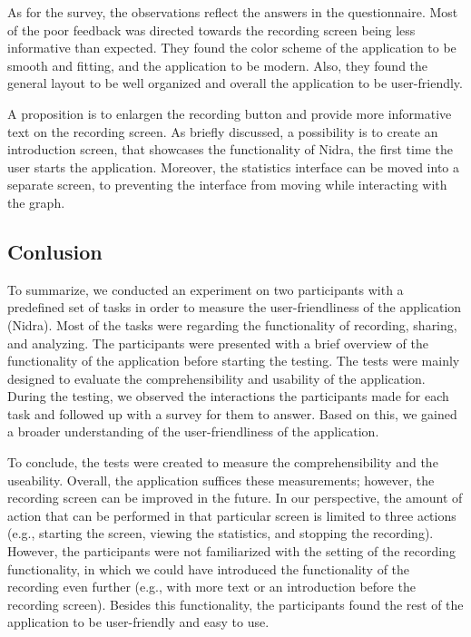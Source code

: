 As for the survey, the observations reflect the answers in the questionnaire. Most of the poor feedback was directed towards the recording screen being less informative than expected. They found the color scheme of the application to be smooth and fitting, and the application to be modern. Also, they found the general layout to be well organized and overall the application to be user-friendly.

A proposition is to enlargen the recording button and provide more informative text on the recording screen. As briefly discussed, a possibility is to create an introduction screen, that showcases the functionality of Nidra, the first time the user starts the application. Moreover, the statistics interface can be moved into a separate screen, to preventing the interface from moving while interacting with the graph.

\subsection{Conlusion}

To summarize, we conducted an experiment on two participants with a predefined set of tasks in order to measure the user-friendliness of the application (Nidra). Most of the tasks were regarding the functionality of recording, sharing, and analyzing. The participants were presented with a brief overview of the functionality of the application before starting the testing. The tests were mainly designed to evaluate the comprehensibility and usability of the application. During the testing, we observed the interactions the participants made for each task and followed up with a survey for them to answer. Based on this, we gained a broader understanding of the user-friendliness of the application.

To conclude, the tests were created to measure the comprehensibility and the useability. Overall, the application suffices these measurements; however, the recording screen can be improved in the future. In our perspective, the amount of action that can be performed in that particular screen is limited to three actions (e.g., starting the screen, viewing the statistics, and stopping the recording). However, the participants were not familiarized with the setting of the recording functionality, in which we could have introduced the functionality of the recording even further (e.g., with more text or an introduction before the recording screen). Besides this functionality, the participants found the rest of the application to be user-friendly and easy to use.


